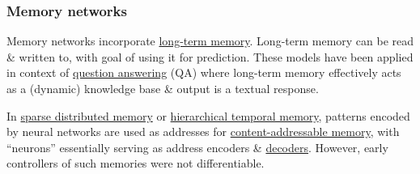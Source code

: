 \documentclass{article}
\begin{document}
\subsubsection{Memory networks}
Memory networks incorporate \href{https://en.wikipedia.org/wiki/Long-term_memory}{long-term memory}. Long-term memory can be read \& written to, with goal of using it for prediction. These models have been applied in context of \href{https://en.wikipedia.org/wiki/Question_answering}{question answering} (QA) where long-term memory effectively acts as a (dynamic) knowledge base \& output is a textual response.

In \href{https://en.wikipedia.org/wiki/Sparse_distributed_memory}{sparse distributed memory} or \href{https://en.wikipedia.org/wiki/Hierarchical_temporal_memory}{hierarchical temporal memory}, patterns encoded by neural networks are used as addresses for \href{https://en.wikipedia.org/wiki/Content-addressable_memory}{content-addressable memory}, with ``neurons'' essentially serving as address encoders \& \href{https://en.wikipedia.org/wiki/Binary_decoder}{decoders}. However, early controllers of such memories were not differentiable.
\end{document}
